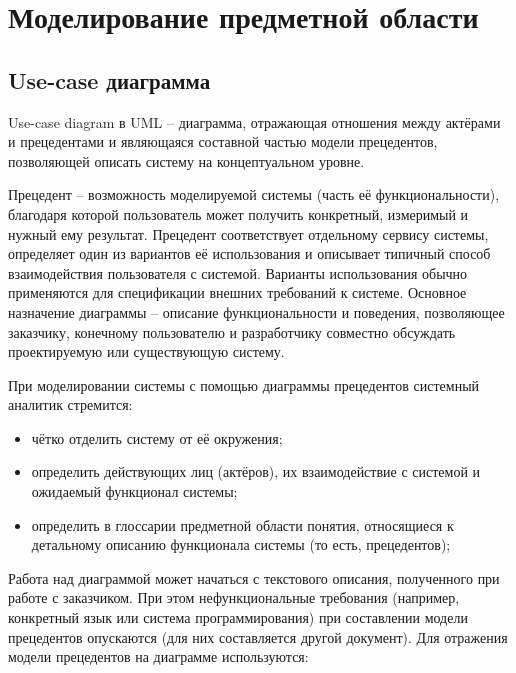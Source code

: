 \lstset{style=fsharpstyle}

\section{Моделирование предметной области} 
\label{sec:practice:technology_used}


\subsection{Use-case диаграмма }
\label{sub:practice:microsoft_net}

Use-case diagram в UML – диаграмма, отражающая отношения между актёрами и прецедентами и являющаяся составной частью модели прецедентов, позволяющей описать систему на концептуальном уровне.

Прецедент – возможность моделируемой системы (часть её функциональности), благодаря которой пользователь может получить конкретный, измеримый и нужный ему результат. Прецедент соответствует отдельному сервису системы, определяет один из вариантов её использования и описывает типичный способ взаимодействия пользователя с системой. Варианты использования обычно применяются для спецификации внешних требований к системе. Основное назначение диаграммы – описание функциональности и поведения, позволяющее заказчику, конечному пользователю и разработчику совместно обсуждать проектируемую или существующую систему.

При моделировании системы с помощью диаграммы прецедентов системный аналитик стремится:
\begin{itemize}
  \item чётко отделить систему от её окружения;
  \item определить действующих лиц (актёров), их взаимодействие с системой и ожидаемый функционал системы;
  \item определить в глоссарии предметной области понятия, относящиеся к детальному описанию функционала системы (то есть, прецедентов);
\end{itemize}

Работа над диаграммой может начаться с текстового описания, полученного при работе с заказчиком. При этом нефункциональные требования (например, конкретный язык или система программирования) при составлении модели прецедентов опускаются (для них составляется другой документ).
Для отражения модели прецедентов на диаграмме используются:

